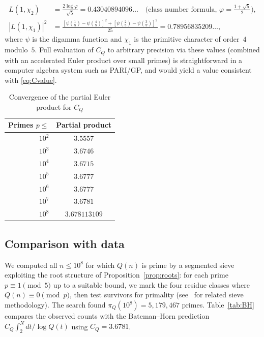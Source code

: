 \documentclass[11pt,a4paper]{article}
\theoremstyle{plain}
\theoremstyle{definition}
\theoremstyle{remark}
\begin{document}
\begin{align*}
L(1,\chi_2) &= \frac{2\log\varphi}{\sqrt{5}} = 0.43040894096\ldots \quad\text{(class number formula, $\varphi = \tfrac{1+\sqrt{5}}{2}$)},\\
|L(1,\chi_1)|^2 &= \frac{[\psi(\tfrac{1}{5})-\psi(\tfrac{4}{5})]^2 + [\psi(\tfrac{2}{5})-\psi(\tfrac{3}{5})]^2}{25} = 0.78956835209\ldots,
\end{align*}
where $\psi$ is the digamma function and $\chi_1$ is the primitive character of order~$4$ modulo~$5$.  Full evaluation of $C_Q$ to arbitrary precision via these values (combined with an accelerated Euler product over small primes) is straightforward in a computer algebra system such as PARI/GP, and would yield a value consistent with \eqref{eq:Cvalue}.

\begin{table}[ht]
\centering
\caption{Convergence of the partial Euler product for $C_Q$}
\label{tab:Cconvergence}
\smallskip
\begin{tabular}{@{}rc@{}}
\toprule
Primes $p \le$ & Partial product \\
\midrule
$10^2$ & $3.5557$ \\
$10^3$ & $3.6746$ \\
$10^4$ & $3.6715$ \\
$10^5$ & $3.6777$ \\
$10^6$ & $3.6777$ \\
$10^7$ & $3.6781$ \\
$10^8$ & $3.678113109$ \\
\bottomrule
\end{tabular}
\end{table}


\subsection{Comparison with data}

We computed all $n \le 10^8$ for which $Q(n)$ is prime by a segmented sieve exploiting the root structure of Proposition~\ref{prop:roots}: for each prime $p \equiv 1 \pmod{5}$ up to a suitable bound, we mark the four residue classes where $Q(n) \equiv 0 \pmod{p}$, then test survivors for primality (see~\cite{galway2004} for related sieve methodology). The search found $\pi_Q(10^8) = 5{,}179{,}467$ primes. Table~\ref{tab:BH} compares the observed counts with the Bateman--Horn prediction $C_Q \int_2^N dt/\!\log Q(t)$ using $C_Q = 3.6781$.
\end{document}
